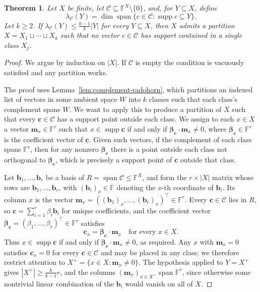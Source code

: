 \documentclass[10pt,a4paper]{amsart}
\newtheorem{theorem}{Theorem}
\newcommand{\F}{\mathbb{F}}
\DeclareMathOperator{\Span}{span}
\begin{document}
\begin{theorem}\label{thm:supportpartition}
Let $X$ be finite, let $\mathcal C\subseteq \F^X\setminus\{0\}$, and, for
$Y\subseteq X$, define
$$
        \lambda_{\mathcal C}(Y)
        =
        \dim\Span\{c\in\mathcal C:\operatorname{supp} c\subseteq Y\}.
$$
Let $k\geq 2$. If $\lambda_{\mathcal C}(Y) \leq \frac{k-1}{k}|Y|$ for every
$Y\subseteq X$, then $X$ admits a partition $X=X_1\sqcup\cdots\sqcup X_k$
such that no vector $c\in\mathcal C$ has support contained in a single
class $X_j$.
\end{theorem}

\begin{proof}
We argue by induction on $|X|$. If $\mathcal C$ is empty the condition is
vacuously satisfied and any partition works.

The proof uses Lemma~\ref{lem:complement-radohorn}, which partitions an indexed list
of vectors in some ambient space $W$ into $k$ classes such that each class's
complement spans $W$. We want to apply this to produce a partition of $X$ such
that every $\mathbf{c} \in \mathcal C$ has a support point outside each
class. We assign to each $x \in X$ a vector $\mathbf{m}_x \in \F^r$
such that $x \in \operatorname{supp} \mathbf{c}$ if and only if
$\boldsymbol{\beta}_{\mathbf{c}} \cdot \mathbf{m}_x \neq 0$, where
$\boldsymbol{\beta}_{\mathbf{c}} \in \F^r$ is the coefficient vector of
$\mathbf{c}$. Given such vectors, if the complement of each class spans $\F^r$,
then for any nonzero $\boldsymbol{\beta}_{\mathbf{c}}$ there is a point outside
each class not orthogonal to $\boldsymbol{\beta}_{\mathbf{c}}$, which is
precisely a support point of $\mathbf{c}$ outside that class.

Let $\mathbf{b}_1, \ldots, \mathbf{b}_r$ be a basis of $R = \Span\mathcal C
\leq \F^X$, and form the $r \times |X|$ matrix whose rows are
$\mathbf{b}_1, \ldots, \mathbf{b}_r$, with $(\mathbf{b}_i)_x \in \F$ denoting
the $x$-th coordinate of $\mathbf{b}_i$. Its column $x$ is the vector
$\mathbf{m}_x = ((\mathbf{b}_1)_x, \ldots, (\mathbf{b}_r)_x)^\top \in \F^r$. Every
$\mathbf{c} \in \mathcal C$ lies in $R$, so $\mathbf{c} = \sum_{i=1}^r
\beta_i \mathbf{b}_i$ for unique coefficients, and the coefficient vector
$\boldsymbol{\beta}_{\mathbf{c}} = (\beta_1, \ldots, \beta_r)^\top \in \F^r$
satisfies
$$
        \mathbf{c}_x = \boldsymbol{\beta}_{\mathbf{c}} \cdot \mathbf{m}_x
        \quad \text{for every } x \in X.
$$
Thus $x \in \operatorname{supp} \mathbf{c}$ if and only if
$\boldsymbol{\beta}_{\mathbf{c}} \cdot \mathbf{m}_x \neq 0$, as required.
Any $x$ with $\mathbf{m}_x = 0$ satisfies $\mathbf{c}_x = 0$ for every
$\mathbf{c} \in \mathcal C$ and may be placed in any class; we therefore
restrict attention to $X^+ = \{x \in X : \mathbf{m}_x \neq 0\}$. The
hypothesis applied to $Y = X^+$ gives $|X^+| \geq \frac{k}{k-1}r$, and the
columns $(\mathbf{m}_x)_{x \in X^+}$ span $\F^r$, since otherwise some
nontrivial linear combination of the $\mathbf{b}_i$ would vanish on all of $X$.


\end{proof}
\end{document}
